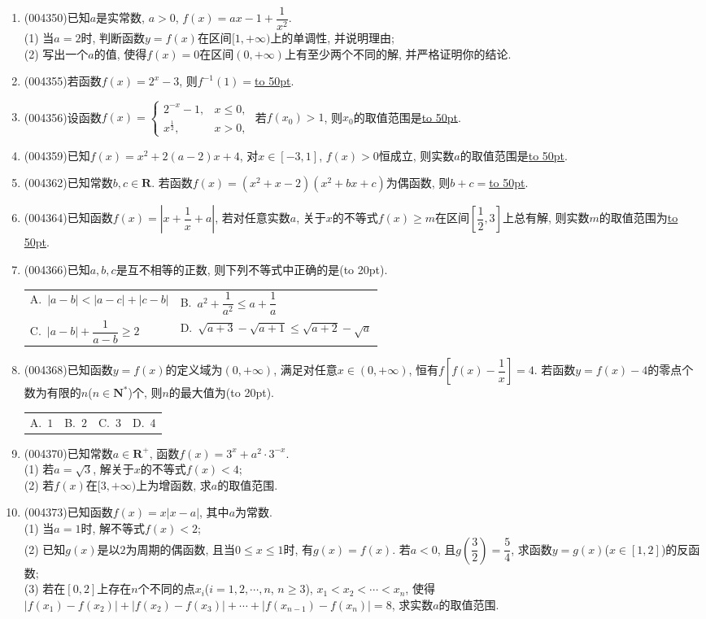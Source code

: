 \documentclass[10pt,a4paper]{article}
\newcommand{\blank}[1]{\underline{\hbox to #1pt{}}}
\newcommand{\bracket}[1]{(\hbox to #1pt{})}
\newcommand{\twoch}[4]{\par\begin{tabular}{p{.46\textwidth}p{.46\textwidth}}
A.~#1& B.~#2\\
C.~#3& D.~#4
\end{tabular}}
\newcommand{\fourch}[4]{\par\begin{tabular}{p{.23\textwidth}p{.23\textwidth}p{.23\textwidth}p{.23\textwidth}}
A.~#1 &B.~#2& C.~#3& D.~#4
\end{tabular}}
\begin{document}
\begin{enumerate}[1.]
{}{命题$P$假, 命题$Q$真}{命题$P$假, 命题$Q$假}
\item {\tiny (004350)}已知$a$是实常数, $a>0$, $f(x)=ax-1+\dfrac 1{x^2}$.\\
(1) 当$a=2$时, 判断函数$y=f(x)$在区间$[1,+\infty)$上的单调性, 并说明理由;\\
(2) 写出一个$a$的值, 使得$f(x)=0$在区间$(0,+\infty)$上有至少两个不同的解, 并严格证明你的结论.
\item {\tiny (004355)}若函数$f(x)=2^x-3$, 则$f^{-1}(1)=$\blank{50}.
\item {\tiny (004356)}设函数$f(x)=\begin{cases} 2^{-x}-1,  & x\le 0,\\ x^\frac 12, & x>0,\end{cases}$ 若$f(x_0)>1$, 则$x_0$的取值范围是\blank{50}.
\item {\tiny (004359)}已知$f(x)=x^2+2(a-2)x+4$, 对$x\in[-3, 1]$, $f(x)>0$恒成立, 则实数$a$的取值范围是\blank{50}.
\item {\tiny (004362)}已知常数$b,c\in \mathbf{R}$. 若函数$f(x)=(x^2+x-2)(x^2+bx+c)$为偶函数, 则$b+c=$\blank{50}.
\item {\tiny (004364)}已知函数$f(x)=|x+\dfrac 1x+a|$, 若对任意实数$a$, 关于$x$的不等式$f(x)\ge m$在区间$[\dfrac 12,3]$上总有解, 则实数$m$的取值范围为\blank{50}.
\item {\tiny (004366)}已知$a,b,c$是互不相等的正数, 则下列不等式中正确的是\bracket{20}.
\twoch{$|a-b|<|a-c|+|c-b|$}{$a^2+\dfrac{1}{a^2}\le a+\dfrac{1}{a}$}{$|a-b|+\dfrac{1}{a-b}\ge 2$}{$\sqrt{a+3}-\sqrt{a+1}\le\sqrt{a+2}-\sqrt a$}
\item {\tiny (004368)}已知函数$y=f(x)$的定义域为$(0,+\infty)$, 满足对任意$x\in (0,+\infty)$, 恒有$f[f(x)-\dfrac 1x]=4$. 若函数$y=f(x)-4$的零点个数为有限的$n$($n\in \mathbf{N}^*$)个, 则$n$的最大值为\bracket{20}.
\fourch{$1$}{$2$}{$3$}{$4$}
\item {\tiny (004370)}已知常数$a\in \mathbf{R}^+$, 函数$f(x)=3^x+a^2\cdot 3^{-x}$.\\
(1) 若$a=\sqrt 3$, 解关于$x$的不等式$f(x)<4$;\\
(2) 若$f(x)$在$[3,+\infty)$上为增函数, 求$a$的取值范围.
\item {\tiny (004373)}已知函数$f(x)=x|x-a|$, 其中$a$为常数.\\
(1) 当$a=1$时, 解不等式$f(x)<2$;\\
(2) 已知$g(x)$是以$2$为周期的偶函数, 且当$0\le x\le 1$时, 有$g(x)=f(x)$. 若$a<0$, 且$g(\dfrac 32)=\dfrac 54$, 求函数$y=g(x)$($x\in [1,2]$)的反函数;\\
(3) 若在$[0,2]$上存在$n$个不同的点$x_i$($i=1,2,\cdots,n$, $n\ge 3$), $x_1<x_2<\cdots <x_n$, 使得$|f(x_1)-f(x_2)|+|f(x_2)-f(x_3)|+\cdots+|f(x_{n-1})-f(x_n)|=8$, 求实数$a$的取值范围.

\end{enumerate}
\end{document}

